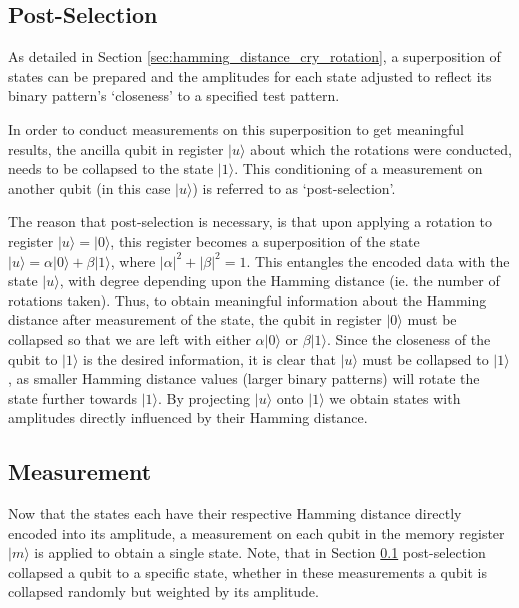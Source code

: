 \subsection{Post-Selection}
\label{sec:post_selection}
As detailed in Section \ref{sec:hamming_distance_cry_rotation}, a superposition of states can be prepared and the amplitudes for each state adjusted to reflect its binary pattern's `closeness' to a specified test pattern.

In order to conduct measurements on this superposition to get meaningful results, the ancilla qubit in register $\vert u \rangle$ about which the rotations were conducted, needs to be collapsed to the state $\vert 1 \rangle$. This conditioning of a measurement on another qubit (in this case $\vert u \rangle$) is referred to as `post-selection'. 

The reason that post-selection is necessary, is that upon applying a rotation to register $\vert u \rangle = \vert 0 \rangle$, this register becomes a superposition of the state $\vert u \rangle = \alpha\vert 0 \rangle + \beta \vert 1 \rangle$, where $\left| \alpha \right|^2 + \left|\beta\right|^2 = 1$. This entangles the encoded data with the state $\vert u \rangle$, with degree depending upon the Hamming distance (ie. the number of rotations taken). Thus, to obtain meaningful information about the Hamming distance after measurement of the state, the qubit in register $\vert 0 \rangle$ must be collapsed so that we are left with either $\alpha \vert 0\rangle$ or $\beta \vert 1\rangle$. Since the closeness of the qubit to $\vert 1\rangle$ is the desired information, it is clear that $\vert u \rangle$ must be collapsed to $\vert 1\rangle$, as smaller Hamming distance values (larger binary patterns) will rotate the state further towards $\vert 1\rangle$. By projecting $\vert u \rangle$ onto $\vert 1 \rangle$ we obtain states with amplitudes directly influenced by their Hamming distance.

\subsection{Measurement}
\label{sec:measurement}
Now that the states each have their respective Hamming distance directly encoded into its amplitude, a measurement on each qubit in the memory register $\vert m \rangle$ is applied to obtain a single state. Note, that in Section \ref{sec:post_selection} post-selection collapsed a qubit to a specific state, whether in these measurements a qubit is collapsed randomly but weighted by its amplitude.

